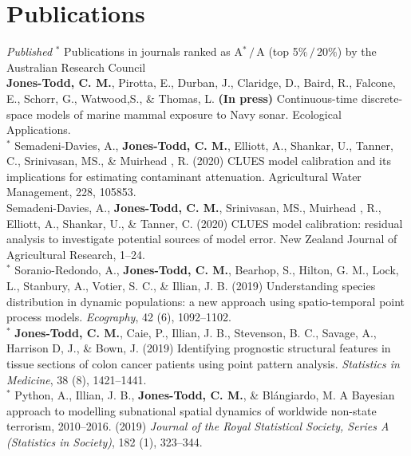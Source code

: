 \documentclass[10pt,a4paper]{moderncv}
\begin{document}
  \section{Publications}

  \textit{\small{Published}} {\footnotesize${}^\ast$ Publications in journals ranked as A${}^\ast\,/\,$A (top 5$\%\,/\,$20$\%$) by the Australian Research Council}\\

   \textbf{Jones-Todd, C. M.}, Pirotta, E., Durban, J., Claridge, D., Baird, R., Falcone, E., Schorr, G., Watwood,S., \& Thomas, L.  \textbf{(In press)} Continuous-time discrete-space models of marine mammal exposure to Navy sonar. Ecological Applications.\\
 
  ${}^\ast$ Semadeni-Davies, A., \textbf{Jones-Todd, C. M.},  Elliott, A., Shankar, U., Tanner, C., Srinivasan, MS., \& Muirhead , R. (2020) CLUES model calibration and its implications for estimating contaminant attenuation. Agricultural Water Management, 228, 105853.\\

    Semadeni-Davies, A., \textbf{Jones-Todd, C. M.}, Srinivasan, MS.,  Muirhead , R.,  Elliott, A., Shankar, U., \& Tanner, C. (2020) CLUES model calibration: residual analysis to investigate potential sources of model error. New Zealand Journal of Agricultural Research, 1--24.\\

${}^\ast$ Soranio-Redondo, A., \textbf{Jones-Todd, C. M.}, Bearhop, S., Hilton, G. M., Lock, L., Stanbury, A., Votier, S. C., \& Illian, J. B. (2019) Understanding species distribution in dynamic populations: a new approach using spatio-temporal point process models. \textit{Ecography}, 42 (6), 1092--1102.\\
  
\vspace{-3pt}
${}^\ast$ \textbf{Jones-Todd, C. M.}, Caie, P., Illian, J. B., Stevenson, B. C., Savage, A., Harrison D, J., \& Bown, J. (2019) Identifying prognostic structural features in tissue sections of colon cancer patients using point pattern analysis. \textit{Statistics in Medicine}, 38 (8), 1421--1441.\\

\vspace{-3pt}
${}^\ast$ Python, A.,  Illian, J. B., \textbf{Jones-Todd, C. M.}, \& Bl\'{a}ngiardo, M. A Bayesian approach to modelling subnational spatial dynamics of worldwide non-state terrorism, 2010--2016. (2019) \textit{Journal of the Royal Statistical Society, Series  A (Statistics in Society)}, 182 (1), 323--344.\\
\end{document}
